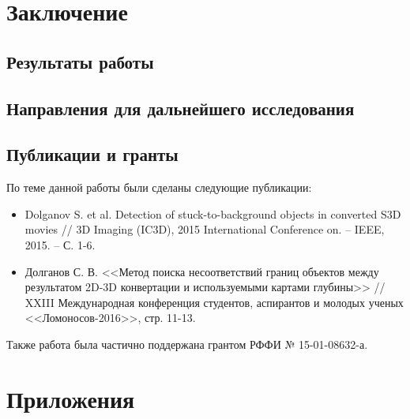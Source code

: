 \documentclass[12pt, a4paper]{article}
\begin{document}
\newpage
\section{Заключение}

\subsection{Результаты работы}

\subsection{Направления для дальнейшего исследования}

\subsection{Публикации и гранты}

По теме данной работы были сделаны следующие публикации:

\begin{itemize}
	\item Dolganov S. et al. Detection of stuck-to-background objects in converted S3D movies // 3D Imaging (IC3D), 2015 International Conference on. – IEEE, 2015. – С. 1-6.
	\item Долганов С. В. <<Метод поиска несоответствий границ объектов между результатом 2D-3D конвертации и используемыми картами глубины>> // XXIII Международная конференция студентов, аспирантов и молодых ученых <<Ломоносов-2016>>, стр. 11-13.
\end{itemize}

Также работа была частично поддержана грантом РФФИ № 15-01-08632-а.

\newpage
\section{Приложения}

\newpage


\end{document}
